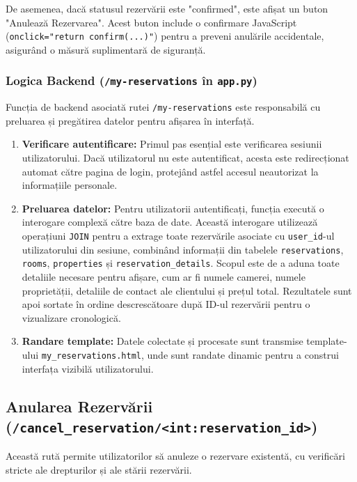 \documentclass[12pt, a4paper, oneside, romanian]{teza-upb}
\begin{document}
De asemenea, dacă statusul rezervării este "confirmed", este afișat un buton "Anulează Rezervarea". Acest buton include o confirmare JavaScript (\texttt{onclick="return confirm(...)"}) pentru a preveni anulările accidentale, asigurând o măsură suplimentară de siguranță.

\subsubsection{Logica Backend (\texttt{/my-reservations} în \texttt{app.py})}
Funcția de backend asociată rutei \texttt{/my-reservations} este responsabilă cu preluarea și pregătirea datelor pentru afișarea în interfață.
\begin{enumerate}
	\item \textbf{Verificare autentificare:} Primul pas esențial este verificarea sesiunii utilizatorului. Dacă utilizatorul nu este autentificat, acesta este redirecționat automat către pagina de login, protejând astfel accesul neautorizat la informațiile personale.
	\item \textbf{Preluarea datelor:} Pentru utilizatorii autentificați, funcția execută o interogare complexă către baza de date. Această interogare utilizează operațiuni \texttt{JOIN} pentru a extrage toate rezervările asociate cu \texttt{user\_id}-ul utilizatorului din sesiune, combinând informații din tabelele \texttt{reservations}, \texttt{rooms}, \texttt{properties} și \texttt{reservation\_details}. Scopul este de a aduna toate detaliile necesare pentru afișare, cum ar fi numele camerei, numele proprietății, detaliile de contact ale clientului și prețul total. Rezultatele sunt apoi sortate în ordine descrescătoare după ID-ul rezervării pentru o vizualizare cronologică.
	\item \textbf{Randare template:} Datele colectate și procesate sunt transmise template-ului \texttt{my\_reservations.html}, unde sunt randate dinamic pentru a construi interfața vizibilă utilizatorului.
\end{enumerate}





\subsection{Anularea Rezervării (\texttt{/cancel\_reservation/<int:reservation\_id>})}


Această rută permite utilizatorilor să anuleze o rezervare existentă, cu verificări stricte ale drepturilor și ale stării rezervării.
\end{document}

